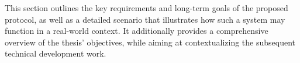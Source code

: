 This section outlines the key requirements and long-term goals of the proposed \pol{} protocol, as well as a detailed scenario that illustrates how such a system may function in a real-world context. It additionally provides a comprehensive overview of the thesis' objectives, while aiming at contextualizing the subsequent technical development work.
